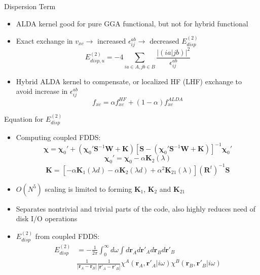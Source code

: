 \documentclass{beamer}
\begin{document}
        \begin{frame}{Dispersion Term}
            \begin{itemize}
                \item ALDA kernel good for pure GGA functional, but not for hybrid functional 
                \item Exact exchange in $v_{xc} \rightarrow$ increased $\epsilon_{ij}^{ab} \rightarrow$ decreased $E_{disp}^{(2)}$ 
                $$E_{disp,u}^{(2)} = -4\sum_{ia \in A,jb \in B} \frac{\left|\left(ia|jb\right)\right|^2}{\epsilon_{ij}^{ab}}$$
                \item Hybrid ALDA kernel to compensate, or localized HF (LHF) exchange to avoid increase in $\epsilon_{ij}^{ab}$
                $$f_{xc} = \alpha f_{xc}^{HF} + (1-\alpha) f_{xc}^{ALDA}$$
            \end{itemize}            
        \end{frame}

        \begin{frame}{Equation for $E_{disp}^{(2)}$}
            \begin{itemize}
                \item Computing coupled FDDS:
                $$\boldsymbol{\chi} = \boldsymbol{\chi}_0' + \left( \boldsymbol{\chi}_0' \mathbf{S}^{-1} \mathbf{W} + \mathbf{K} \right) \left[ \mathbf{S} - \left( \boldsymbol{\chi}_0' \mathbf{S}^{-1} \mathbf{W} + \mathbf{K} \right) \right]^{-1} \boldsymbol{\chi}_0'$$
                $$\boldsymbol{\chi}_0' = \boldsymbol{\chi}_0 - \alpha \mathbf{K}_2 \left( \lambda \right)$$
                $$\mathbf{K} = \left[ - \alpha \mathbf{K}_1 \left( \lambda d\right) - \alpha \mathbf{K}_2 \left( \lambda d\right) + \alpha^2 \mathbf{K}_{21} \left( \lambda \right) \right] \left( \mathbf{R}^t \right)^{-1} \mathbf{S}$$
                \item $O(N^5)$ scaling is limited to forming  $\mathbf{K}_1$, $\mathbf{K}_2$ and $\mathbf{K}_{21}$
                \item Separates nontrivial and trivial parts of the code, also highly reduces need of disk I/O operations
                \item $E_{disp}^{(2)}$ from coupled FDDS:
                \begin{eqnarray}
                    \nonumber
                    E_{disp}^{(2)} &= -\frac{1}{2\pi}\int_0^\infty d\omega \int d\mathbf{r}_A d\mathbf{r}'_A d\mathbf{r}_B d\mathbf{r}'_B \\ \nonumber
                    & \frac{1}{\left|\mathbf{r}_A-\mathbf{r}_B\right|}\frac{1}{\left|\mathbf{r}'_A-\mathbf{r}'_B\right|}\chi^A\left(\mathbf{r}_A,\mathbf{r}'_A|i\omega\right)\chi^B\left(\mathbf{r}_B,\mathbf{r}'_B|i\omega\right)
                \end{eqnarray}
            \end{itemize}
        \end{frame}
        
\end{document}

